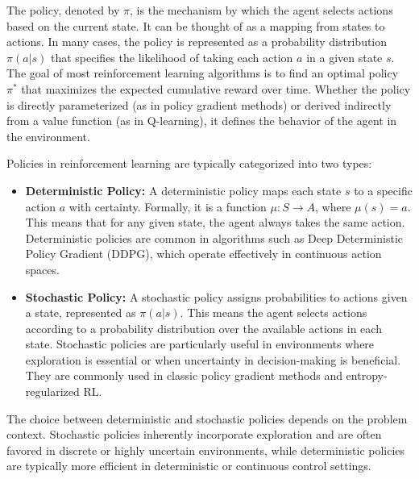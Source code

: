 \documentclass[12pt,a4paper,twoside,openany]{book}
\begin{document}
The policy, denoted by \(\pi\), is the mechanism by which the agent selects actions based on the current state. It can be thought of as a mapping from states to actions. In many cases, the policy is represented as a probability distribution \(\pi(a|s)\) that specifies the likelihood of taking each action \(a\) in a given state \(s\). The goal of most reinforcement learning algorithms is to find an optimal policy \(\pi^*\) that maximizes the expected cumulative reward over time. Whether the policy is directly parameterized (as in policy gradient methods) or derived indirectly from a value function (as in Q-learning), it defines the behavior of the agent in the environment.

Policies in reinforcement learning are typically categorized into two types:

\begin{itemize}
    \item \textbf{Deterministic Policy:} A deterministic policy maps each state \(s\) to a specific action \(a\) with certainty. Formally, it is a function \(\mu: S \rightarrow A\), where \(\mu(s) = a\). This means that for any given state, the agent always takes the same action. Deterministic policies are common in algorithms such as Deep Deterministic Policy Gradient (DDPG), which operate effectively in continuous action spaces.

    \item \textbf{Stochastic Policy:} A stochastic policy assigns probabilities to actions given a state, represented as \(\pi(a|s)\). This means the agent selects actions according to a probability distribution over the available actions in each state. Stochastic policies are particularly useful in environments where exploration is essential or when uncertainty in decision-making is beneficial. They are commonly used in classic policy gradient methods and entropy-regularized RL.
\end{itemize}

The choice between deterministic and stochastic policies depends on the problem context. Stochastic policies inherently incorporate exploration and are often favored in discrete or highly uncertain environments, while deterministic policies are typically more efficient in deterministic or continuous control settings.
\end{document}
